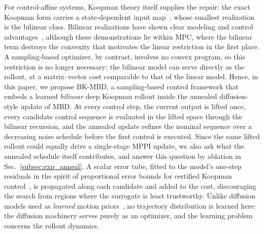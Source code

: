 \documentclass[lettersize,journal]{IEEEtran}
\theoremstyle{remark}
\newcommand{\bkmbd}{\textsc{BK-MBD}}
\begin{document}
For control-affine systems, Koopman theory itself supplies the repair:
the exact Koopman form carries a state-dependent input
map~\cite{iacob2024}, whose smallest realization is the bilinear class.
Bilinear realizations have shown clear modeling and control
advantages~\cite{bruder2021bilinear, folkestad2021, mamakoukas2019},
although these demonstrations lie within MPC, where the bilinear term
destroys the convexity that motivates the linear restriction in the
first place.
A sampling-based optimizer, by contrast, involves no convex program, so
this restriction is no longer necessary: the bilinear model can serve
directly as the rollout, at a matrix--vector cost comparable to that of
the linear model.
Hence, in this paper, we propose \bkmbd{}, a sampling-based control
framework that embeds a learned \emph{bilinear} deep Koopman rollout
inside the annealed diffusion-style update of MBD. At every control
step, the current output is lifted once, every candidate control
sequence is evaluated in the lifted space through the bilinear
recursion, and the annealed update refines the nominal sequence over a
decreasing noise schedule before the first control is executed. Since
the same lifted rollout could equally drive a single-stage MPPI update,
we also ask what the annealed schedule itself contributes, and answer
this question by ablation in Sec.~\ref{subsec:exp_anneal}. A scalar error tube, fitted
to the model's one-step residuals in the spirit of proportional error
bounds for certified Koopman control~\cite{strasser2026, safedmd2024}, is
propagated along each candidate and added to the cost, discouraging the
search from regions where the surrogate is least trustworthy.
Unlike diffusion models used as \emph{learned} motion
priors~\cite{janner2022planning, chi2025diffusion, carvalho2023motion}, no
trajectory distribution is learned here: the diffusion machinery serves
purely as an optimizer, and the learning problem concerns the rollout
dynamics.
\end{document}

